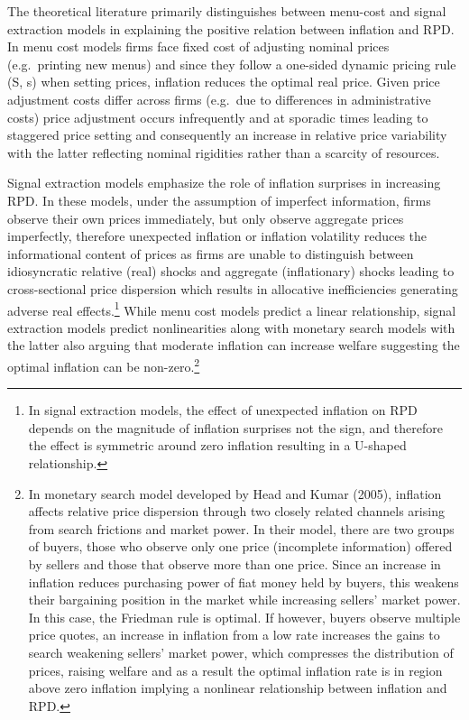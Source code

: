 \documentclass[
  letterpaper,
  DIV=11,
  numbers=noendperiod]{scrartcl}
\begin{document}
The theoretical literature primarily distinguishes between menu-cost and
signal extraction models in explaining the positive relation between
inflation and RPD. In menu cost models
\citep{sheshinki1979, sheshinski1983, rotemberg1983, benabou1992} firms
face fixed cost of adjusting nominal prices (e.g.~printing new menus)
and since they follow a one-sided dynamic pricing rule (S, s) when
setting prices, inflation reduces the optimal real price. Given price
adjustment costs differ across firms (e.g.~due to differences in
administrative costs) price adjustment occurs infrequently and at
sporadic times leading to staggered price setting and consequently an
increase in relative price variability with the latter reflecting
nominal rigidities rather than a scarcity of resources.

Signal extraction models emphasize the role of inflation surprises in
increasing RPD. In these models, under the assumption of imperfect
information, firms observe their own prices immediately, but only
observe aggregate prices imperfectly, therefore unexpected inflation or
inflation volatility reduces the informational content of prices as
firms are unable to distinguish between idiosyncratic relative (real)
shocks and aggregate (inflationary) shocks
\citep{lucas1973, hercowitz1981, cukierman1983, barro1976} leading to
cross-sectional price dispersion which results in allocative
inefficiencies generating adverse real effects.\footnote{In signal
  extraction models, the effect of unexpected inflation on RPD depends
  on the magnitude of inflation surprises not the sign, and therefore
  the effect is symmetric around zero inflation resulting in a U-shaped
  relationship.} While menu cost models predict a linear relationship,
signal extraction models predict nonlinearities along with monetary
search models \citep{head2005} with the latter also arguing that
moderate inflation can increase welfare suggesting the optimal inflation
can be non-zero.\footnote{In monetary search model developed by Head and
  Kumar (2005), inflation affects relative price dispersion through two
  closely related channels arising from search frictions and market
  power. In their model, there are two groups of buyers, those who
  observe only one price (incomplete information) offered by sellers and
  those that observe more than one price. Since an increase in inflation
  reduces purchasing power of fiat money held by buyers, this weakens
  their bargaining position in the market while increasing sellers'
  market power. In this case, the Friedman rule is optimal. If however,
  buyers observe multiple price quotes, an increase in inflation from a
  low rate increases the gains to search weakening sellers' market
  power, which compresses the distribution of prices, raising welfare
  and as a result the optimal inflation rate is in region above zero
  inflation implying a nonlinear relationship between inflation and RPD.}
\end{document}
